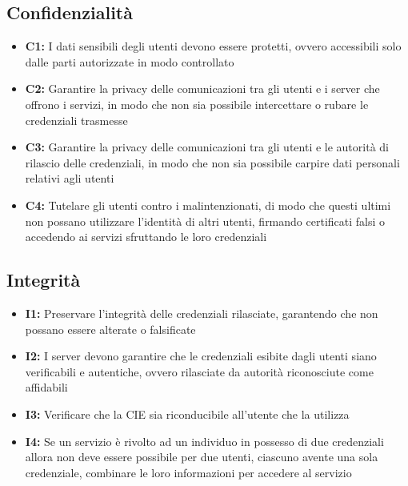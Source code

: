         \subsection{Confidenzialità}
            \begin{itemize}
                \item \textbf{C1:} I dati sensibili degli utenti devono essere protetti, ovvero accessibili solo dalle parti autorizzate in modo controllato
                
                \item \textbf{C2:} Garantire la privacy delle comunicazioni tra gli utenti e i server che offrono i servizi, in modo che non sia possibile intercettare o rubare le credenziali trasmesse
    
                \item \textbf{C3:} Garantire la privacy delle comunicazioni tra gli utenti e le autorità di rilascio delle credenziali, in modo che non sia possibile carpire dati personali relativi agli utenti
                
                \item \textbf{C4:} Tutelare gli utenti contro i malintenzionati, di modo che questi ultimi non possano utilizzare l'identità di altri utenti, firmando certificati falsi o accedendo ai servizi sfruttando le loro credenziali
            \end{itemize}
    
        \subsection{Integrità}
            \begin{itemize}
                    \item \textbf{I1:} Preservare l'integrità delle credenziali rilasciate, garantendo che non possano essere alterate o falsificate
                
                \item \textbf{I2:} I server devono garantire che le credenziali esibite dagli utenti siano verificabili e autentiche, ovvero rilasciate da autorità riconosciute come affidabili
    
                \item \textbf{I3:} Verificare che la CIE sia riconducibile all'utente che la utilizza
                
                \item \textbf{I4:} Se un servizio è rivolto ad un individuo in possesso di due credenziali allora non deve essere possibile per due utenti, ciascuno avente una sola credenziale, combinare le loro informazioni per accedere al servizio
            \end{itemize}
    
